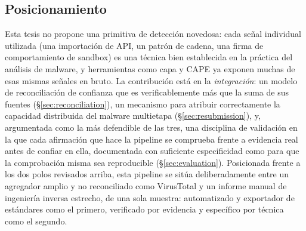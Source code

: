 \subsection{Posicionamiento}

Esta tesis no propone una primitiva de detecci\'on novedosa: cada
se\~nal individual utilizada (una importaci\'on de API, un patr\'on de
cadena, una firma de comportamiento de sandbox) es una t\'ecnica bien
establecida en la pr\'actica del an\'alisis de malware, y herramientas
como capa y CAPE ya exponen muchas de esas mismas se\~nales en bruto.
La contribuci\'on est\'a en la \emph{integraci\'on}: un modelo de
reconciliaci\'on de confianza que es verificablemente m\'as que la suma
de sus fuentes (\S\ref{sec:reconciliation}), un mecanismo para atribuir
correctamente la capacidad distribuida del malware multietapa
(\S\ref{sec:resubmission}), y, argumentada como la m\'as defendible de
las tres, una disciplina de validaci\'on en la que cada afirmaci\'on que
hace la pipeline se comprueba frente a evidencia real antes de confiar
en ella, documentada con suficiente especificidad como para que la
comprobaci\'on misma sea reproducible (\S\ref{sec:evaluation}).
Posicionada frente a los dos polos revisados arriba, esta pipeline se
sit\'ua deliberadamente entre un agregador amplio y no reconciliado
como VirusTotal y un informe manual de ingenier\'ia inversa estrecho,
de una sola muestra: automatizado y exportador de est\'andares como el
primero, verificado por evidencia y espec\'ifico por t\'ecnica como el
segundo.
